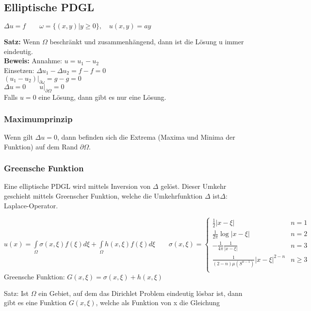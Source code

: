 \subsection{Elliptische PDGL}
$\Delta u=f\qquad \omega=\{(x,y)|y\geq 0\},\quad u(x,y)=ay$

\textbf{Satz:} Wenn $\Omega$ beschränkt und zusammenhängend, dann ist die Lösung u immer eindeutig.\\

\textbf{Beweis:} Annahme: $u=u_1-u_2$\\
Einsetzen: $\Delta u_1 - \Delta u_2=f-f=0$\\
$\left.(u_1-u_2)\right|_{\partial \omega}=g-g=0$\\
$\Delta u=0 \qquad \left.u\right|_{\partial\Omega}=0$\\
Falls $u=0$ eine Lösung, dann gibt es nur eine Lösung.

\subsubsection{Maximumprinzip} 

Wenn gilt $\Delta u=0$, dann befinden sich die Extrema (Maxima und Minima der Funktion) auf dem Rand $\partial\Omega$.

\subsubsection{Greensche Funktion} 

Eine elliptische PDGL wird mittels Inversion von $\Delta$ gelöst. Dieser Umkehr geschieht mittels Greenscher Funktion, welche die Umkehrfunktion $\Delta$ ist\qquad $\Delta$: Laplace-Operator.

$u(x)=\int\limits_\Omega{\sigma(x,\xi)f(\xi)d\xi}+\int\limits_\Omega{h(x,\xi)f(\xi)d\xi}\qquad \sigma(x,\xi)=
\begin{cases}
	\frac 12|x-\xi| & n=1\\ 
	\frac 1{2\pi}\log|x-\xi| & n=2\\
	-\frac 1{4\pi}\frac{1}{|x-\xi|} & n=3\\
	\frac {1}{(2-n)\mu(S^{n-1})}|x-\xi|^{2-n} & n\geq 3\\
\end{cases}$\\


Greensche Funktion: $G(x,\xi)=\sigma(x,\xi)+h(x,\xi)$

Satz: Ist $\Omega$ ein Gebiet, auf dem das Dirichlet Problem eindeutig lösbar ist, dann gibt es eine Funktion $G(x,\xi)$, welche als Funktion von x die Gleichung

